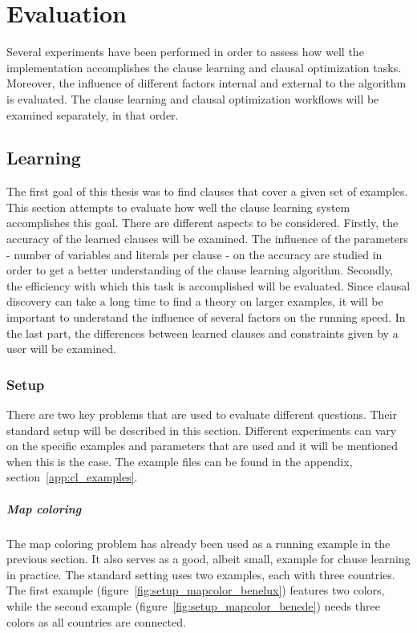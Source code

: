 \chapter{Evaluation}
\label{cha:evaluation}

Several experiments have been performed in order to assess how well the implementation accomplishes the clause learning and clausal optimization tasks.
Moreover, the influence of different factors internal and external to the algorithm is evaluated.
The clause learning and clausal optimization workflows will be examined separately, in that order.

\section{Learning}
The first goal of this thesis was to find clauses that cover a given set of examples.
This section attempts to evaluate how well the clause learning system accomplishes this goal.
There are different aspects to be considered.
Firstly, the accuracy of the learned clauses will be examined.
The influence of the parameters - number of variables and literals per clause - on the accuracy are studied in order to get a better understanding of the clause learning algorithm.
Secondly, the efficiency with which this task is accomplished will be evaluated.
Since clausal discovery can take a long time to find a theory on larger examples, it will be important to understand the influence of several factors on the running speed.
In the last part, the differences between learned clauses and constraints given by a user will be examined.

\subsection{Setup}
There are two key problems that are used to evaluate different questions.
Their standard setup will be described in this section.
Different experiments can vary on the specific examples and parameters that are used and it will be mentioned when this is the case.
The example files can be found in the appendix, section~\ref{app:cl_examples}.

\paragraph{Map coloring}
The map coloring problem has already been used as a running example in the previous section.
It also serves as a good, albeit small, example for clause learning in practice.
The standard setting uses two examples, each with three countries.
The first example (figure~\ref{fig:setup_mapcolor_benelux}) features two colors, while the second example (figure~\ref{fig:setup_mapcolor_benede}) needs three colors as all countries are connected.

